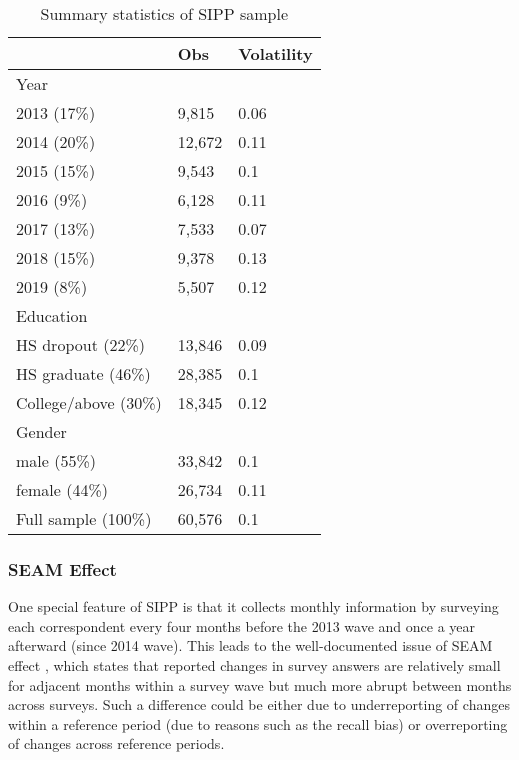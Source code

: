 \begin{table}[!ht]
    \centering
    \caption{Summary statistics of SIPP sample}
    \label{tab:sipp_sum_stat}
\begin{tabular}{lll}
\hline \hline 
                     & Obs    & Volatility \\
                     \hline 
Year                 &        &            \\
\hline 
2013 (17\%)          & 9,815  & 0.06       \\
2014 (20\%)          & 12,672 & 0.11       \\
2015 (15\%)          & 9,543  & 0.1        \\
2016 (9\%)           & 6,128  & 0.11       \\
2017 (13\%)          & 7,533  & 0.07       \\
2018 (15\%)          & 9,378  & 0.13       \\
2019 (8\%)           & 5,507  & 0.12       \\
\hline 
Education                 &        &            \\
\hline 
HS dropout (22\%)    & 13,846 & 0.09       \\
HS graduate (46\%)   & 28,385 & 0.1        \\
College/above (30\%) & 18,345 & 0.12       \\

                     \hline 
Gender               &        &            \\
\hline 
male (55\%)          & 33,842 & 0.1        \\
female (44\%)        & 26,734 & 0.11       \\
\hline \hline 
Full sample (100\%)        & 60,576 & 0.1       \\
\hline \hline 
\end{tabular}
\end{table}

\subsubsection{SEAM Effect}

One special feature of SIPP is that it collects monthly information by surveying each correspondent every four months before the 2013 wave and once a year afterward (since 2014 wave). This leads to the well-documented issue of SEAM effect \citep{ryscavage1993seam,rips2003straightening, nekarda2008weekly, callegaro2008seam}, which states that reported changes in survey answers are relatively small for adjacent months within a survey wave but much more abrupt between months across surveys. Such a difference could be either due to underreporting of changes within a reference period (due to reasons such as the recall bias) or overreporting of changes across reference periods. 

